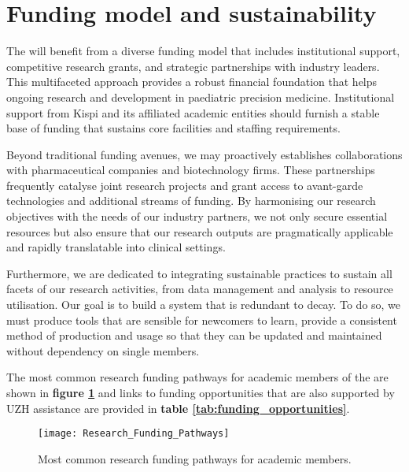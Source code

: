 \section{Funding model and sustainability}

The \pmu will benefit from a diverse funding model that includes institutional support, competitive research grants, and strategic partnerships with industry leaders. This multifaceted approach provides a robust financial foundation that helps ongoing research and development in paediatric precision medicine. Institutional support from Kispi and its affiliated academic entities should furnish a stable base of funding that sustains core facilities and staffing requirements.

Beyond traditional funding avenues, we may proactively establishes collaborations with pharmaceutical companies and biotechnology firms. These partnerships frequently catalyse joint research projects and grant access to avant-garde technologies and additional streams of funding. By harmonising our research objectives with the needs of our industry partners, we not only secure essential resources but also ensure that our research outputs are pragmatically applicable and rapidly translatable into clinical settings.

Furthermore, we are dedicated to integrating sustainable practices to sustain all facets of our research activities, from data management and analysis to  resource utilisation. Our goal is to build a system that is redundant to decay. To do so, we must produce tools that are sensible for newcomers to learn, provide a consistent method of production and usage so that they can be updated and maintained without dependency on single members. 

The most common research funding pathways for academic members of the \pmu are shown in 
\textbf{figure
\ref{fig:Research_Funding_Pathways}} 
and links to funding opportunities that are also supported by UZH assistance are provided in 
\textbf{table
\ref{tab:funding_opportunities}}.

\begin{figure}[h] \hspace*{0cm} 
\begin{center}
	\texttt{[image: Research\_Funding\_Pathways]}
	\caption{Most common research funding pathways for academic members.}
	\label{fig:Research_Funding_Pathways}
\end{center}
\end{figure}

